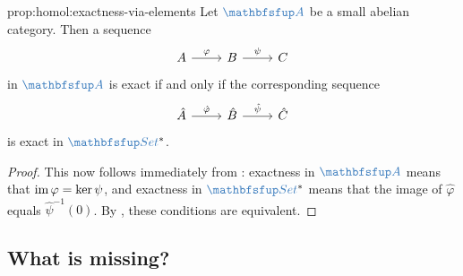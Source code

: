 \begin{prop}{}{prop:homol:exactness-via-elements}
  Let $\categ{A}$ be a small abelian category. Then a sequence
  \[\begin{tikzcd}
      A \arrow[r, "\varphi"] & B \arrow[r, "\psi"] & C
    \end{tikzcd}\] in $\categ{A}$ is exact if and only if the
  corresponding sequence
  \[\begin{tikzcd}
      \hat{A} \arrow[r, "\hat{\varphi}"] & \hat{B} \arrow[r,
      "\hat{\psi}"] & \hat{C}
    \end{tikzcd}\] is exact in $\categ{Set}^*$.
\end{prop}

\begin{proof}
  This now follows immediately from : exactness
  in $\categ{A}$ means that $\operatorname{im}\varphi = \ker\psi$, and exactness
  in $\categ{Set}^*$ means that the image of $\hat{\varphi}$ equals
  $\hat{\psi}^{-1}(0)$. By , these conditions are
  equivalent.
\end{proof}

\subsection{What is missing?}
\label{subsec:homol:what-is-missing}

